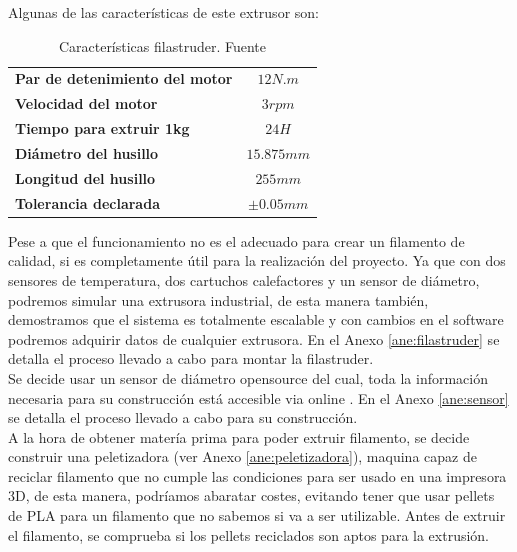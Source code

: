 Algunas de las características de este extrusor son:

\begin{table}[H]
    \centering

        \begin{tabular}{lc}
        \textbf{Par de detenimiento del motor}            & $12N.m$                           \\
        \textbf{Velocidad del motor}                      & $3 rpm$                           \\
        \textbf{Tiempo para extruir 1kg}                  & $24H$                             \\
        \textbf{Diámetro del husillo}                     & $15.875mm$                        \\
        \textbf{Longitud del husillo}                     & $255mm$                           \\
        \textbf{Tolerancia declarada}                     & $\pm 0.05 mm$                     \\   

    \end{tabular}
    \caption[Características filastruder.]{Características filastruder. Fuente\cite{tfg_diego}}
    \label{tab:caract_filas}
\end{table}

Pese a que el funcionamiento no es el adecuado para crear un filamento de calidad, si es completamente útil para la realización del proyecto. Ya que con dos sensores de temperatura, dos cartuchos calefactores y un sensor de diámetro, podremos simular una extrusora industrial, de esta manera también, demostramos que el sistema es totalmente escalable y con cambios en el software podremos adquirir datos de cualquier extrusora. En el Anexo \ref{ane:filastruder} se detalla el proceso llevado a cabo para montar la filastruder.\\

Se decide usar un sensor de diámetro opensource del cual, toda la información necesaria para su construcción está accesible via online \cite{thing_filamento}. En el Anexo \ref{ane:sensor} se detalla el proceso llevado a cabo para su construcción.\\

A la hora de obtener matería prima para poder extruir filamento, se decide construir una peletizadora (ver Anexo \ref{ane:peletizadora}), maquina capaz de reciclar filamento que no cumple las condiciones para ser usado en una impresora 3D, de esta manera, podríamos abaratar costes, evitando tener que usar pellets de PLA para un filamento que no sabemos si va a ser utilizable. Antes de extruir el filamento, se comprueba si los pellets reciclados son aptos para la extrusión.\\


